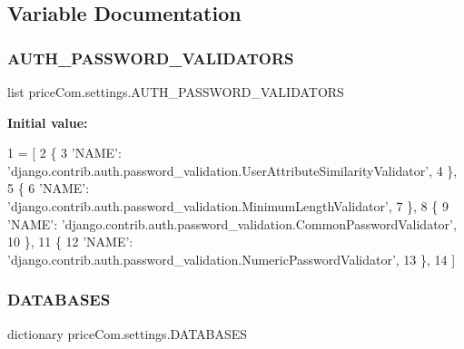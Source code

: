 \subsection{Variable Documentation}
\mbox{\label{namespacepriceCom_1_1settings_a47303467852512ad7f91c63d954d028e}} 
\subsubsection{\texorpdfstring{A\+U\+T\+H\+\_\+\+P\+A\+S\+S\+W\+O\+R\+D\+\_\+\+V\+A\+L\+I\+D\+A\+T\+O\+RS}{AUTH\_PASSWORD\_VALIDATORS}}
{\footnotesize\ttfamily list price\+Com.\+settings.\+A\+U\+T\+H\+\_\+\+P\+A\+S\+S\+W\+O\+R\+D\+\_\+\+V\+A\+L\+I\+D\+A\+T\+O\+RS}

{\bfseries Initial value\+:}
\begin{DoxyCode}
1 =  [
2     \{
3         \textcolor{stringliteral}{'NAME'}: \textcolor{stringliteral}{'django.contrib.auth.password\_validation.UserAttributeSimilarityValidator'},
4     \},
5     \{
6         \textcolor{stringliteral}{'NAME'}: \textcolor{stringliteral}{'django.contrib.auth.password\_validation.MinimumLengthValidator'},
7     \},
8     \{
9         \textcolor{stringliteral}{'NAME'}: \textcolor{stringliteral}{'django.contrib.auth.password\_validation.CommonPasswordValidator'},
10     \},
11     \{
12         \textcolor{stringliteral}{'NAME'}: \textcolor{stringliteral}{'django.contrib.auth.password\_validation.NumericPasswordValidator'},
13     \},
14 ]
\end{DoxyCode}
\mbox{\label{namespacepriceCom_1_1settings_a31f880f87c74ac3c9fa280f18509aac2}} 
\subsubsection{\texorpdfstring{D\+A\+T\+A\+B\+A\+S\+ES}{DATABASES}}
{\footnotesize\ttfamily dictionary price\+Com.\+settings.\+D\+A\+T\+A\+B\+A\+S\+ES}

